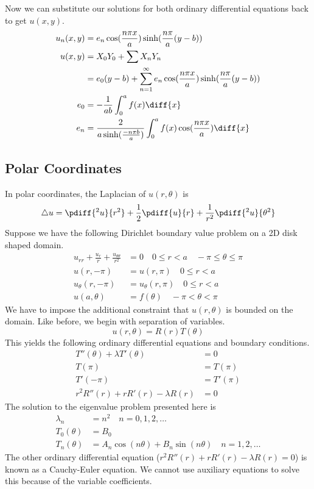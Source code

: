 \documentclass{math}
\begin{document}
Now we can substitute our solutions for both ordinary differential equations
back to get \( u(x,y) \).
\begin{align*}
  u_n(x,y) &= e_n\cos(\frac{n\pi x}{a})\sinh(\frac{n\pi}{a}(y-b)) \\
  u(x,y) &= X_0Y_0+\sum X_nY_n \\
  &= e_0(y-b)+\sum_{n=1}^{\infty}e_n\cos(\frac{n\pi x}{a})
    \sinh(\frac{n\pi}{a}(y-b)) \\
  e_0 &= -\frac{1}{ab}\int_{0}^{a}f(x)\diff{x} \\
  e_n &= \frac{2}{a\sinh(\frac{-n\pi b}{a})}
    \int_{0}^{a}f(x)\cos(\frac{n\pi x}{a})\diff{x}
\end{align*}

\subsection*{Polar Coordinates}
In polar coordinates, the Laplacian of \( u(r,\theta) \) is
\[ \triangle u =
  \pdiff{^2u}{r^2}+\frac{1}{2}\pdiff{u}{r}+\frac{1}{r^2}\pdiff{^2u}{\theta^2} \]
Suppose we have the following Dirichlet boundary value problem on a 2D disk
shaped domain.
\begin{align*}
  u_{rr}+\frac{u_r}{r}+\frac{u_{\theta\theta}}{r^2} &= 0 \quad 0\le r<a \quad
    -\pi\le\theta\le\pi \\
  u(r,-\pi) &= u(r,\pi) \quad 0\le r<a \\
  u_{\theta}(r,-\pi) &= u_{\theta}(r,\pi) \quad 0\le r<a \\
  u(a,\theta) &= f(\theta) \quad -\pi<\theta<\pi
\end{align*}
We have to impose the additional constraint that \( u(r,\theta) \) is bounded
on the domain. Like before, we begin with separation of variables.
\[ u(r,\theta) = R(r)T(\theta) \]
This yields the following ordinary differential equations and boundary
conditions.
\begin{align*}
  T''(\theta)+\lambda T'(\theta) &= 0 \\
  T(\pi) &= T(\pi) \\
  T'(-\pi) &= T'(\pi) \\
  r^2R''(r)+rR'(r)-\lambda R(r) &= 0
\end{align*}
The solution to the eigenvalue problem presented here is
\begin{align*}
  \lambda_n &= n^2 \quad n = 0,1,2,\dots \\
  T_0(\theta) &= B_0 \\
  T_n(\theta) &= A_n\cos(n\theta)+B_n\sin(n\theta) \quad n = 1,2,\dots
\end{align*}
The other ordinary differential equation (\( r^2R''(r)+rR'(r)-\lambda R(r) =
0 \)) is known as a Cauchy-Euler equation. We cannot use auxiliary equations to
solve this because of the variable coefficients.
\end{document}
